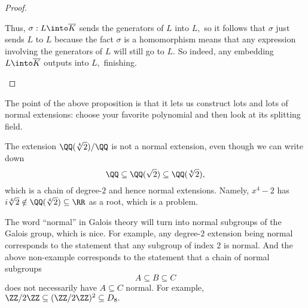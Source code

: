 \documentclass[../notes.tex]{subfiles}
\begin{document}
\begin{proof}
\begin{itemize}
		Thus, $\sigma:L\into\overline K$ sends the generators of $L$ into $L,$ so it follows that $\sigma$ just sends $L$ to $L$ because the fact $\sigma$ is a homomorphism means that any expression involving the generators of $L$ will still go to $L.$ So indeed, any embedding $L\into\overline K$ outputs into $L,$ finishing.
		\qedhere
	\end{itemize}
\end{proof}
The point of the above proposition is that it lets us construct lots and lots of normal extensions: choose your favorite polynomial and then look at its splitting field.
\begin{nex}
	The extension $\QQ(\sqrt[4]2)/\QQ$ is not a normal extension, even though we can write down
	\[\QQ\subseteq\QQ(\sqrt2)\subseteq\QQ(\sqrt[4]2),\]
	which is a chain of degree-$2$ and hence normal extensions. Namely, $x^4-2$ has $i\sqrt[4]2\notin\QQ(\sqrt[4]2)\subseteq\RR$ as a root, which is a problem.
\end{nex}
\begin{remark}
	The word ``normal'' in Galois theory will turn into normal subgroups of the Galois group, which is nice. For example, any degree-$2$ extension being normal corresponds to the statement that any subgroup of index $2$ is normal. And the above non-example corresponds to the statement that a chain of normal subgroups
	\[A\subseteq B\subseteq C\]
	does not necessarily have $A\subseteq C$ normal. For example, $\ZZ/2\ZZ\subseteq(\ZZ/2\ZZ)^2\subseteq D_8.$
\end{remark}
\end{document}
